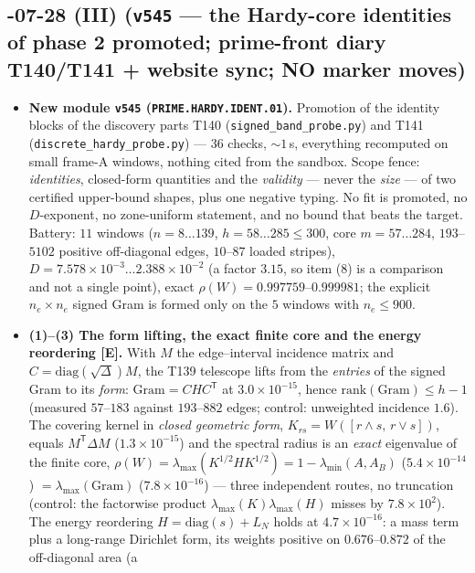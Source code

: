 \documentclass[11pt]{article}
\providecommand{\mE}{\textbf{[E]}}\providecommand{\mC}{\textbf{[C]}}
\begin{document}
\subsection*{-07-28 (III) (\texttt{v545} --- the Hardy-core identities of phase 2 promoted; prime-front diary T140/T141 + website sync; NO marker moves)}
\begin{itemize}[leftmargin=1.5em]
\item \textbf{New module \texttt{v545} (\texttt{PRIME.HARDY.IDENT.01}).} Promotion of the identity
blocks of the discovery parts T140 (\texttt{signed\_band\_probe.py}) and T141
(\texttt{discrete\_hardy\_probe.py}) --- $36$ checks, ${\sim}1$\,s, everything recomputed on small
frame-A windows, nothing cited from the sandbox. Scope fence: \emph{identities}, closed-form
quantities and the \emph{validity} --- never the \emph{size} --- of two certified upper-bound
shapes, plus one negative typing. No fit is promoted, no $D$-exponent, no zone-uniform statement,
and no bound that beats the target. Battery: $11$ windows ($n=8\ldots139$, $h=58\ldots285\le300$,
core $m=57\ldots284$, $193$--$5102$ positive off-diagonal edges, $10$--$87$ loaded stripes),
$D=7.578\times10^{-3}\ldots2.388\times10^{-2}$ (a factor $3.15$, so item (8) is a comparison and not
a single point), exact $\rho(W)=0.997759$--$0.999981$; the explicit $n_e\times n_e$ signed Gram is
formed only on the $5$ windows with $n_e\le900$.
\item \textbf{(1)--(3) The form lifting, the exact finite core and the energy reordering \mE.} With
$M$ the edge--interval incidence matrix and $C=\mathrm{diag}(\sqrt\Delta)M$, the T139 telescope
lifts from the \emph{entries} of the signed Gram to its \emph{form}: $\mathrm{Gram}=CHC^{\mathsf T}$
at $3.0\times10^{-15}$, hence $\mathrm{rank}(\mathrm{Gram})\le h-1$ (measured $57$--$183$ against
$193$--$882$ edges; control: unweighted incidence $1.6$). The covering kernel in \emph{closed
geometric form}, $K_{rs}=W([r\wedge s,\,r\vee s])$, equals $M^{\mathsf T}\Delta M$
($1.3\times10^{-15}$) and the spectral radius is an \emph{exact} eigenvalue of the finite core,
$\rho(W)=\lambda_{\max}(K^{1/2}HK^{1/2})=1-\lambda_{\min}(A,A_B)$ ($5.4\times10^{-14}$)
$=\lambda_{\max}(\mathrm{Gram})$ ($7.8\times10^{-16}$) --- three independent routes, no truncation
(control: the factorwise product $\lambda_{\max}(K)\lambda_{\max}(H)$ misses by $7.8\times10^{2}$).
The energy reordering $H=\mathrm{diag}(s)+L_N$ holds at $4.7\times10^{-16}$: a mass term plus a
long-range Dirichlet form, its weights positive on $0.676$--$0.872$ of the off-diagonal area (a

\end{itemize}
\end{document}
